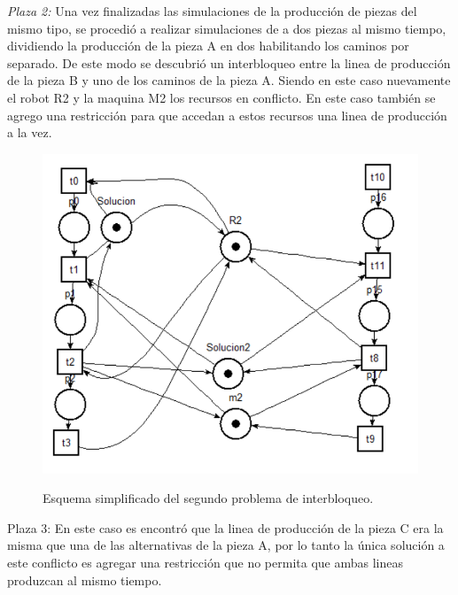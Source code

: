 \documentclass[10pt, a4paper,notitlepage]{article}
\begin{document}
\textit{Plaza 2:}
Una vez finalizadas las simulaciones de la producción de piezas del mismo tipo, se procedió a realizar simulaciones de a dos piezas al mismo tiempo, dividiendo la producción de la pieza A en dos habilitando los caminos por separado. De este modo se descubrió un interbloqueo entre la linea de producción de la pieza B y uno de los caminos de la pieza A. Siendo en este caso nuevamente el robot R2 y la maquina M2 los recursos en conflicto. En este caso también se agrego una restricción para que accedan a estos recursos una linea de producción a la vez.

\begin{figure}[H] %
	{\includegraphics[width=0.4\linewidth]{./figure/I21}}
	\caption{Esquema simplificado del segundo problema de interbloqueo.}
	\label{fig:I20}
\end{figure}

Plaza 3:
En este caso es encontró que la linea de producción de la pieza C era la misma que una de las alternativas de la pieza A, por lo tanto la única solución a este conflicto es agregar una restricción que no permita que ambas lineas produzcan al mismo tiempo. 
\end{document}
